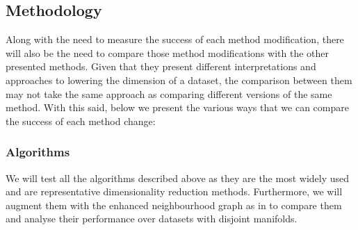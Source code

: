     
\subsection{Methodology}
Along with the need to measure the success of each method modification, there will also be the need to compare those method modifications with the other presented methods. Given that they present different interpretations and approaches to lowering the dimension of a dataset, the comparison between them may not take the same approach as comparing different versions of the same method.
With this said, below we present the various ways that we can compare the success of each method change:

\subsubsection{Algorithms}

We will test all the algorithms described above as they are the most widely used and are representative dimensionality reduction methods. Furthermore, we will augment them with the enhanced neighbourhood graph as in \cite{inspiration} to compare them and analyse their performance over datasets with disjoint manifolds.


